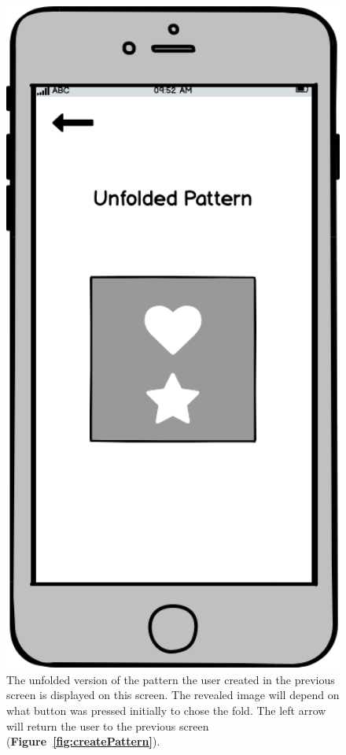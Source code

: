 \documentclass[11pt]{article}
\begin{document}
            \begin{figure}
                \begin{minipage}[c]{0.65\textwidth}
                \caption{The unfolded version of the pattern the user created in the previous screen is displayed on this screen. The revealed image will depend on what button was pressed initially to chose the fold. The left arrow will return the user to the previous screen (\textbf{Figure~\ref{fig:createPattern}}).}
                \label{fig:reveal}
                \end{minipage}\hfill
                \begin{minipage}[c]{0.35\textwidth}
                \includegraphics[width=1\textwidth]{Images/Prototype/prototypeReveal}
                \end{minipage}
            \end{figure}
            
\end{document}
